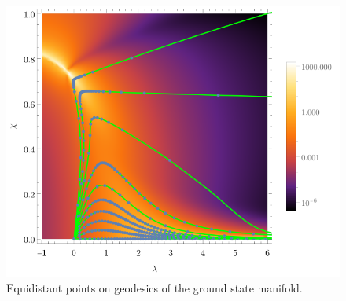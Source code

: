 \begin{figure}[H]
    \centering
    \includegraphics[scale=1.2]{../img/equidistantPointsOnPath.pdf}
    \caption{Equidistant points on geodesics of the ground state manifold.}
    \label{fig:equidistantPointsOnPath}    
\end{figure}

